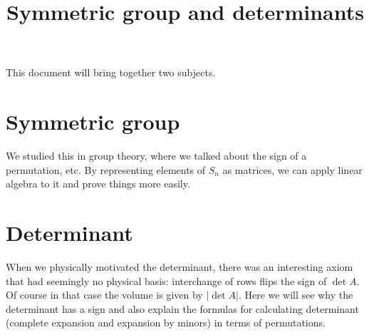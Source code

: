 \documentclass{article}
\title{Symmetric group and determinants}
\date{}
\begin{document}
\maketitle

This document will bring together two subjects.

\section{Symmetric group}

We studied this in group theory, where we talked about the sign of a permutation, etc. By representing elements of $S_n$ as matrices, we can apply linear algebra to it and prove things more easily.

\section{Determinant}

When we physically motivated the determinant, there was an interesting axiom that had seemingly no physical basis: interchange of rows flips the sign of $\det A$. Of course in that case the volume is given by $| \det A |$. Here we will see why the determinant has a sign and also explain the formulas for calculating determinant (complete expansion and expansion by minors) in terms of permutations.
\end{document}
